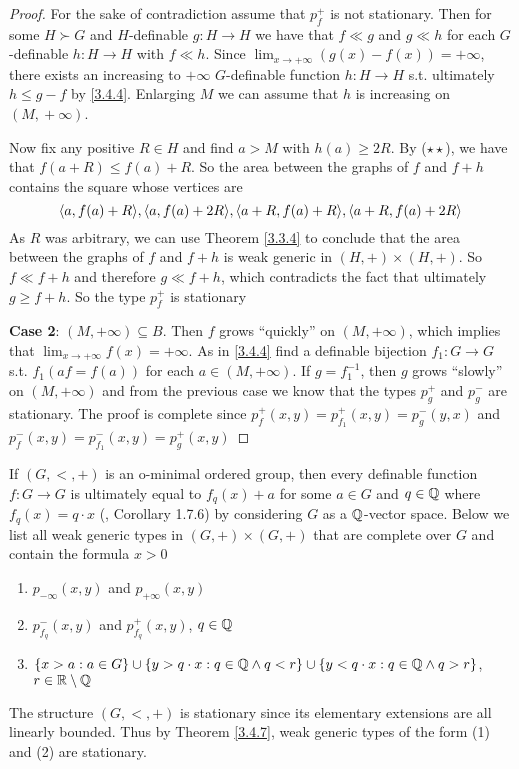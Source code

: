 \documentclass[11pt]{article}
\begin{document}
\begin{proof}
For the sake of contradiction assume that \(p_f^+\) is not stationary. Then for some \(H\succ G\) and
\(H\)-definable \(g:H\to H\) we have that \(f\ll g\) and \(g\ll h\) for each \(G\)-definable \(h:H\to H\)
with \(f\ll h\).
Since \(\lim_{x\to+\infty}(g(x)-f(x))=+\infty\), there exists an increasing
to \(+\infty\) \(G\)-definable function \(h:H\to H\) s.t. ultimately \(h\le g-f\) by \ref{3.4.4}.
Enlarging \(M\) we can assume that \(h\) is increasing on \((M,​+\infty)\).

Now fix any positive \(R\in H\) and find \(a>M\) with \(h(a)\ge 2R\). By (\(\star\star\)), we have
that \(f(a+R)\le f(a)+R\). So the area between the graphs of \(f\) and \(f+h\) contains the square
whose vertices are
\begin{equation*}
\langle a,f(a)+R\rangle,\langle a,f(a)+2R\rangle,\langle a+R,f(a)+R\rangle,\langle a+R,f(a)+2R\rangle
\end{equation*}
As \(R\) was arbitrary, we can use Theorem \ref{3.3.4} to conclude that the area between the
graphs of \(f\) and \(f+h\) is weak generic in \((H,+)\times(H,+)\). So \(f\ll f+h\) and
therefore \(g\ll f+h\), which contradicts the fact that ultimately \(g\ge f+h\). So the
type \(p_f^+\) is stationary

\textbf{Case 2}: \((M,+\infty)\subseteq B\).  Then \(f\) grows ``quickly'' on \((M,+\infty)\), which implies
that \(\lim_{x\to+\infty}f(x)=+\infty\). As in \ref{3.4.4} find a definable bijection \(f_1:G\to G\)
s.t. \(f_1(af=f(a))\) for each \(a\in(M,+\infty)\). If \(g=f_1^{-1}\), then \(g\) grows ``slowly''
on \((M,+\infty)\) and from the previous case we know that the types \(p_g^+\) and \(p_g^-\) are
stationary. The proof is complete since
\(p_f^+(x,y)=p_{f_1}^+(x,y)=p_g^-(y,x)\) and \(p_f^-(x,y)=p_{f_1}^-(x,y)=p_g^+(x,y)\)
\end{proof}

\begin{examplle}[]
If \((G,<,+)\) is an o-minimal ordered group, then every definable function \(f:G\to G\) is
ultimately equal to \(f_q(x)+a\) for some \(a\in G\) and \(q\in\mathbb{Q}\) where \(f_q(x)=q\cdot x\)
(\cite{van1998tame}, Corollary 1.7.6) by considering \(G\) as a \(\mathbb{Q}\)-vector space. Below we list
all weak generic types in \((G,+)\times(G,+)\)
that are complete over \(G\) and contain the formula \(x>0\)
\begin{enumerate}
\item \(p_{-\infty}(x,y)\) and \(p_{+\infty}(x,y)\)
\item \(p_{f_q}^-(x,y)\) and \(p_{f_q}^+(x,y)\), \(q\in\mathbb{Q}\)
\item \(\{x>a:a\in G\}\cup\{y>q\cdot x:q\in\mathbb{Q}\wedge q<r\}\cup\{y<q\cdot x:q\in\mathbb{Q}\wedge q>r\}\), \(r\in\mathbb{R}\setminus\mathbb{Q}\)
\end{enumerate}
The structure \((G,<,+)\) is stationary since its elementary extensions are all linearly
bounded. Thus by Theorem \ref{3.4.7}, weak generic types of the form (1) and (2) are stationary.
\end{examplle}
\end{document}
